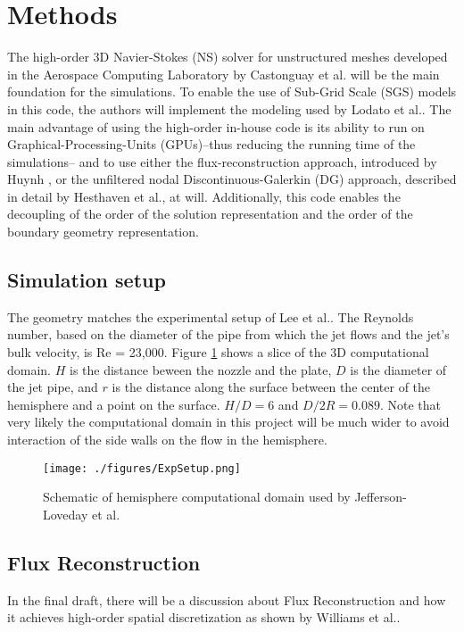 \section{Methods}
The high-order 3D Navier-Stokes (NS) solver for unstructured meshes developed in the Aerospace Computing Laboratory by Castonguay et al.\cite{castonguay2011} will be the main foundation for the simulations. To enable the use of Sub-Grid Scale (SGS) models in this code, the authors will implement the modeling used by Lodato et al.\cite{lodato2012}. The main advantage of using the high-order in-house code is its ability to run on Graphical-Processing-Units (GPUs)--thus reducing the running time of the simulations-- and to use either the flux-reconstruction approach, introduced by Huynh \cite{huynh2007}, or the unfiltered nodal Discontinuous-Galerkin (DG) approach, described in detail by Hesthaven et al.\cite{hesthaven2007}, at will. Additionally, this code enables the decoupling of the order of the solution representation and the order of the boundary geometry representation.

\subsection{Simulation setup}
The geometry matches the experimental setup of Lee et al.\cite{lee1997}. The Reynolds number, based on the diameter of the pipe from which the jet flows and the jet's bulk velocity, is Re = 23,000. Figure \ref{fig:setup} shows a slice of the 3D computational domain. $H$ is the distance beween the nozzle and the plate, $D$ is the diameter of the jet pipe, and $r$ is the distance along the surface between the center of the hemisphere and a point on the surface. $H/D = 6$ and $D/2R = 0.089$. Note that very likely the computational domain in this project will be much wider to avoid interaction of the side walls on the flow in the hemisphere.

\begin{figure}
\centering
\texttt{[image: ./figures/ExpSetup.png]} \\
\caption{Schematic of hemisphere computational domain used by Jefferson-Loveday et al.\cite{jefferson2010}}
\label{fig:setup}
\end{figure}

\subsection{Flux Reconstruction}
In the final draft, there will be a discussion about Flux Reconstruction and how it achieves high-order spatial discretization as shown by Williams et al.\cite{williams2011}.
